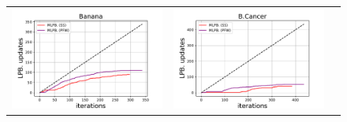 \begin{figure}[p]
    \centering
    \begin{tabular}{ccc}
        \begin{minipage}[t]{0.31\hsize}
            \centering
            \includegraphics[keepaspectratio, scale=0.30]
            {figure/mlpb_lpb_update_banana.pdf}
        \end{minipage}
        &
        \begin{minipage}[t]{0.31\hsize}
            \centering
            \includegraphics[keepaspectratio, scale=0.30]
            {figure/mlpb_lpb_update_breast_cancer.pdf}
        \end{minipage}
        &
        \begin{minipage}[t]{0.31\hsize}
            \centering

\end{minipage}
\end{tabular}
\end{figure}
